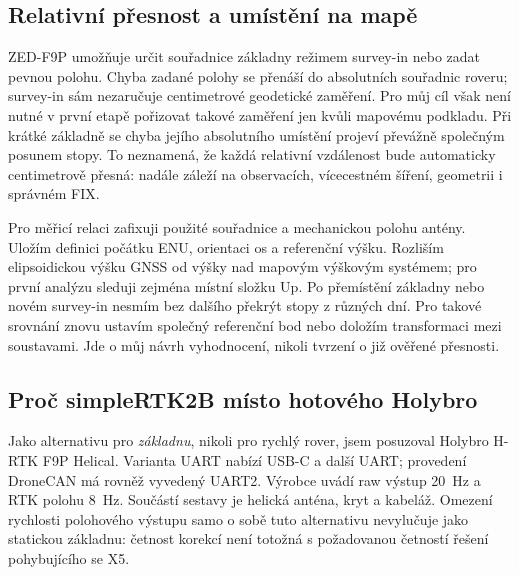 \subsection{Relativní přesnost a umístění na mapě}

ZED-F9P umožňuje určit souřadnice základny režimem survey-in nebo zadat
pevnou polohu. Chyba zadané polohy se přenáší do absolutních souřadnic
roveru; survey-in sám nezaručuje centimetrové geodetické zaměření.
\cite{ublox-f9p-integration}
Pro můj cíl však není nutné v první etapě pořizovat takové zaměření jen
kvůli mapovému podkladu. Při krátké základně se chyba jejího absolutního
umístění projeví převážně společným posunem stopy. To neznamená, že každá
relativní vzdálenost bude automaticky centimetrově přesná: nadále záleží
na observacích, vícecestném šíření, geometrii i správném FIX.

Pro měřicí relaci zafixuji použité souřadnice a mechanickou polohu antény.
Uložím definici počátku ENU, orientaci os a referenční výšku. Rozliším
elipsoidickou výšku GNSS od výšky nad mapovým výškovým systémem; pro
první analýzu sleduji zejména místní složku Up. Po přemístění základny
nebo novém survey-in nesmím bez dalšího překrýt stopy z různých dní.
Pro takové srovnání znovu ustavím společný referenční bod nebo doložím
transformaci mezi soustavami. Jde o můj návrh vyhodnocení, nikoli tvrzení
o již ověřené přesnosti.

\subsection{Proč simpleRTK2B místo hotového Holybro}
\label{sec:base-board}

Jako alternativu pro \emph{základnu}, nikoli pro rychlý rover, jsem
posuzoval Holybro H-RTK F9P Helical. Varianta UART nabízí USB-C a další
UART; provedení DroneCAN má rovněž vyvedený UART2. Výrobce uvádí
raw výstup \SI{20}{Hz} a RTK polohu \SI{8}{Hz}. Součástí sestavy je
helická anténa, kryt a kabeláž.\cite{holybro-f9p-uart,holybro-f9p-can}
Omezení rychlosti polohového výstupu samo o sobě tuto alternativu
nevylučuje jako statickou základnu: četnost korekcí není totožná
s požadovanou četností řešení pohybujícího se X5.

